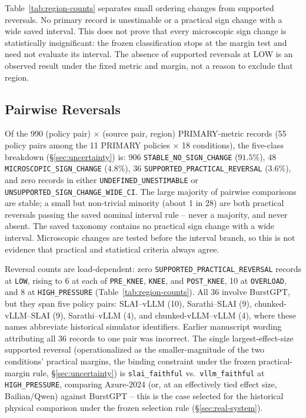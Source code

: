Table~\ref{tab:region-counts} separates small ordering changes from
supported reversals. No primary record is unestimable or a practical sign
change with a wide saved interval. This does not prove that every
microscopic sign change is statistically insignificant: the frozen
classification stops at the margin test and need not evaluate its interval.
The absence of supported reversals at LOW is an observed result under the
fixed metric and margin, not a reason to exclude that region.


\subsection{Pairwise Reversals}
\label{sec:reversals}

Of the 990 (policy pair) $\times$ (source pair, region) PRIMARY-metric
records (55 policy pairs among the 11 PRIMARY policies $\times$ 18
conditions), the
five-class breakdown (\S\ref{sec:uncertainty}) is: $906$
\texttt{STABLE\_NO\_SIGN\_CHANGE} ($91.5\%$), $48$
\texttt{MICROSCOPIC\_SIGN\_CHANGE} ($4.8\%$), $36$
\texttt{SUPPORTED\_PRACTICAL\_REVERSAL} ($3.6\%$), and zero records in
either \texttt{UNDEFINED\_UNESTIMABLE} or
\texttt{UNSUPPORTED\_SIGN\_CHANGE\_WIDE\_CI}. The large majority of
pairwise comparisons are stable; a small but non-trivial minority (about 1
in 28) are both practical reversals passing the saved nominal interval rule -- never
a majority, and never absent. The saved taxonomy contains no practical sign change with a wide interval. Microscopic changes are tested before the interval branch, so this is not evidence that practical and statistical criteria always agree.



Reversal counts are load-dependent: zero \texttt{SUPPORTED\_PRACTICAL\_REVERSAL}
records at \texttt{LOW}, rising to 6 at each of \texttt{PRE\_KNEE},
\texttt{KNEE}, and \texttt{POST\_KNEE}, 10 at \texttt{OVERLOAD}, and 8 at
\texttt{HIGH\_PRESSURE} (Table~\ref{tab:region-counts}). All 36 involve BurstGPT, but they span five policy pairs: SLAI--vLLM
(10), Sarathi--SLAI (9), chunked-vLLM--SLAI (9), Sarathi--vLLM (4), and
chunked-vLLM--vLLM (4), where these names abbreviate historical simulator
identifiers. Earlier manuscript wording attributing all 36 records to one
pair was incorrect. The single largest-effect-size supported reversal (operationalized
as the smaller-magnitude of the two conditions' practical margins, the
binding constraint under the frozen practical-margin rule,
\S\ref{sec:uncertainty}) is \texttt{slai\_faithful} vs.\
\texttt{vllm\_faithful} at \texttt{HIGH\_PRESSURE}, comparing Azure-2024
(or, at an effectively tied effect size, Bailian/Qwen) against BurstGPT --
this is the case selected for the historical physical comparison under the frozen
selection rule (\S\ref{sec:real-system}).

